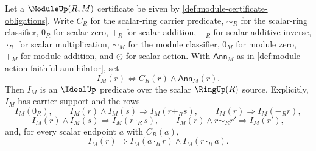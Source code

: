 \begin{theorem}
\label{thm:module-action-annihilator-ideal-predicate}
Let a $\ModuleUp(R,M)$ certificate be given by \autoref{def:module-certificate-obligations}. Write $C_R$ for the scalar-ring carrier predicate, $\sim_R$ for the scalar-ring classifier, $0_R$ for scalar zero, $+_R$ for scalar addition, $-_R$ for scalar additive inverse, $\cdot_R$ for scalar multiplication, $\sim_M$ for the module classifier, $0_M$ for module zero, $+_M$ for module addition, and $\odot$ for scalar action. With $\mathsf{Ann}_M$ as in \autoref{def:module-action-faithful-annihilator}, set
$$
I_M(r)\Longleftrightarrow C_R(r)\land\mathsf{Ann}_M(r).
$$
Then $I_M$ is an $\IdealUp$ predicate over the scalar $\RingUp(R)$ source. Explicitly, $I_M$ has carrier support and the rows
$$
I_M(0_R),\qquad
I_M(r)\land I_M(s)\Longrightarrow I_M(r+_R s),\qquad
I_M(r)\Longrightarrow I_M(-_R r),
$$
$$
I_M(r)\land I_M(s)\Longrightarrow I_M(r\cdot_R s),\qquad
I_M(r)\land r\sim_R r'\Longrightarrow I_M(r'),
$$
and, for every scalar endpoint $a$ with $C_R(a)$,
$$
I_M(r)\Longrightarrow I_M(a\cdot_R r)\land I_M(r\cdot_R a).
$$
\end{theorem}

